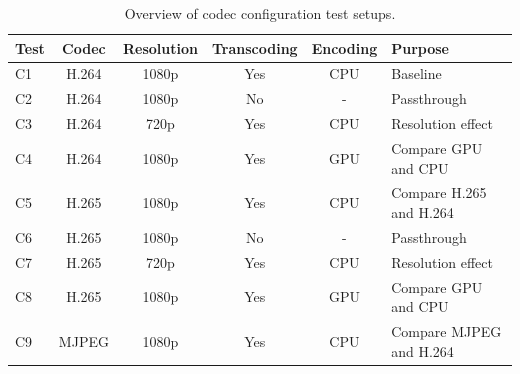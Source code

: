 \begin{table}[H]
    \centering
    \caption{Overview of codec configuration test setups.}
    \label{tab:codec_overview}
    \begin{tabular}{@{}lccccl@{}}
        \toprule
        \textbf{Test} & \textbf{Codec} & \textbf{Resolution} & \textbf{Transcoding} & \textbf{Encoding} & \textbf{Purpose} \\
        \midrule
        C1 & H.264        & 1080p & Yes & CPU & Baseline \\
        C2 & H.264        & 1080p & No  & \-- & Passthrough \\
        C3 & H.264        & 720p  & Yes & CPU & Resolution effect \\
        C4 & H.264        & 1080p & Yes & GPU & Compare GPU and CPU\\
        C5 & H.265        & 1080p & Yes & CPU & Compare H.265 and H.264 \\
        C6 & H.265        & 1080p & No  & \-- & Passthrough \\
        C7 & H.265        & 720p  & Yes & CPU & Resolution effect \\
        C8 & H.265        & 1080p & Yes & GPU & Compare GPU and CPU  \\
        C9 & MJPEG        & 1080p & Yes & CPU & Compare MJPEG and H.264 \\
        \bottomrule
    \end{tabular}
\end{table}
